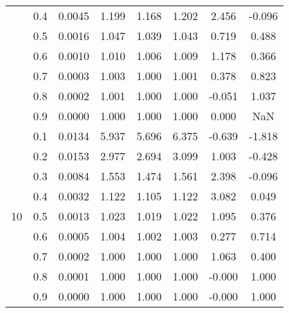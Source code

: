 \documentclass[11pt,a4paper]{report}
\begin{document}
\begin{longtable}{ | c | c || c | c | c | c | c | c | }
 & 0.4 & 0.0045 & 1.199 & 1.168 & 1.202 & 2.456 & -0.096 \\
 & 0.5 & 0.0016 & 1.047 & 1.039 & 1.043 & 0.719 & 0.488 \\
 & 0.6 & 0.0010 & 1.010 & 1.006 & 1.009 & 1.178 & 0.366 \\
 & 0.7 & 0.0003 & 1.003 & 1.000 & 1.001 & 0.378 & 0.823 \\
 & 0.8 & 0.0002 & 1.001 & 1.000 & 1.000 & -0.051 & 1.037 \\
 & 0.9 & 0.0000 & 1.000 & 1.000 & 1.000 & 0.000 & NaN \\
 \hline
\multirow{9}{*}{10} & 0.1 & 0.0134 & 5.937 & 5.696 & 6.375 & -0.639 & -1.818 \\
 & 0.2 & 0.0153 & 2.977 & 2.694 & 3.099 & 1.003 & -0.428 \\
 & 0.3 & 0.0084 & 1.553 & 1.474 & 1.561 & 2.398 & -0.096 \\
 & 0.4 & 0.0032 & 1.122 & 1.105 & 1.122 & 3.082 & 0.049 \\
 & 0.5 & 0.0013 & 1.023 & 1.019 & 1.022 & 1.095 & 0.376 \\
 & 0.6 & 0.0005 & 1.004 & 1.002 & 1.003 & 0.277 & 0.714 \\
 & 0.7 & 0.0002 & 1.000 & 1.000 & 1.000 & 1.063 & 0.400 \\
 & 0.8 & 0.0001 & 1.000 & 1.000 & 1.000 & -0.000 & 1.000 \\
 & 0.9 & 0.0000 & 1.000 & 1.000 & 1.000 & -0.000 & 1.000 \\
 \hline
\hline
\end{longtable}
\end{document}
